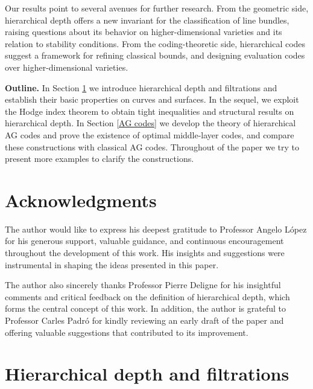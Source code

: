 \documentclass[14pt]{amsart}
\theoremstyle{plain}
\theoremstyle{definition}
\theoremstyle{remark}
\theoremstyle{example}
\begin{document}
Our results point to several avenues for further research. From the geometric side, 
hierarchical depth offers a new invariant for the classification of line bundles, 
raising questions about its behavior on higher-dimensional varieties and its relation 
to stability conditions. From the coding-theoretic side, hierarchical codes suggest 
a framework for refining classical bounds, and designing evaluation codes over higher-dimensional varieties.


\medskip
\noindent
\textbf{Outline.} In Section \ref{Sec:Hierar} we introduce hierarchical depth 
and filtrations and establish their basic properties on curves and surfaces. In the sequel, we exploit the Hodge index theorem to obtain tight inequalities and structural results on hierarchical depth. In Section \ref{AG codes} we develop the 
theory of hierarchical AG codes and prove the existence of optimal middle-layer codes, 
and compare these constructions with classical AG codes. Throughout of the paper we try to present more examples to clarify the constructions.


\section*{Acknowledgments}

The author would like to express his deepest gratitude to Professor Angelo López for his generous support, valuable guidance, and continuous encouragement throughout the development of this work. His insights and suggestions were instrumental in shaping the ideas presented in this paper.

The author also sincerely thanks Professor Pierre Deligne for his insightful comments and critical feedback on the definition of hierarchical depth, which forms the central concept of this work. In addition, the author is grateful to Professor Carles Padró for kindly reviewing an early draft of the paper and offering valuable suggestions that contributed to its improvement.


\section{Hierarchical depth and filtrations}
\label{Sec:Hierar}
\end{document}
